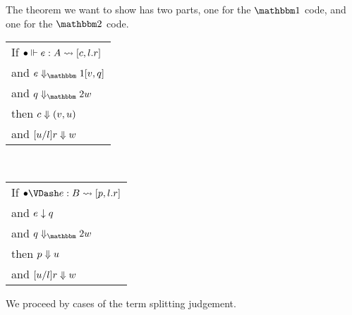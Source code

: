 \documentclass{article}
\begin{document}
The theorem we want to show has two parts, one for the $\bbone$ code, and one for the $\bbtwo$ code.  
\begin{center}
\begin{tabular}{l}
If $\splitone [\emptyC]{e}{A}{c,l.r}$ \\
and $\rsone{e}{v}{q}$ \\
and $\reducetwo{q}{w}$ \\
then $\reduce{c}{\valprod{v}{u}}$ \\
and $\reduce{[u/l]r}{w}$
\end{tabular}
~~~
\begin{tabular}{l}
If $\splittwo[\emptyC]{e}{B}{p,l.r}$ \\
and $\rstwo{e}{q}$ \\
and $\reducetwo{q}{w}$ \\
then $\reduce{p}{u}$ \\
and $\reduce{[u/l]r}{w}$ 
\end{tabular}
\end{center}

We proceed by cases of the term splitting judgement.
\end{document}
